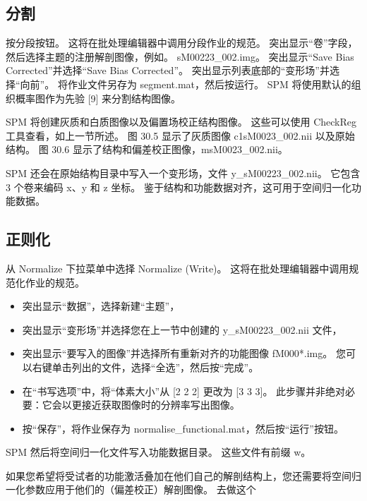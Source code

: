 \subsection{分割}
按分段按钮。 这将在批处理编辑器中调用分段作业的规范。 突出显示“卷”字段，然后选择主题的注册解剖图像，例如。 sM00223\_002.img。 突出显示“Save Bias Corrected”并选择“Save Bias Corrected”。 突出显示列表底部的“变形场”并选择“向前”。 将作业文件另存为 segment.mat，然后按运行。 SPM 将使用默认的组织概率图作为先验 [9] 来分割结构图像。

SPM 将创建灰质和白质图像以及偏置场校正结构图像。 这些可以使用 CheckReg 工具查看，如上一节所述。 图 30.5 显示了灰质图像 c1sM0023\_002.nii 以及原始结构。 图 30.6 显示了结构和偏差校正图像，msM0023\_002.nii。

SPM 还会在原始结构目录中写入一个变形场，文件 y\_sM00223\_002.nii。 它包含 3 个卷来编码 x、y 和 z 坐标。 鉴于结构和功能数据对齐，这可用于空间归一化功能数据。

\subsection{正则化}
从 Normalize 下拉菜单中选择 Normalize (Write)。 这将在批处理编辑器中调用规范化作业的规范。

\begin{itemize}
	\item 突出显示“数据”，选择新建“主题”，
	
	\item 突出显示“变形场”并选择您在上一节中创建的 y\_sM00223\_002.nii 文件，
	
	\item 突出显示“要写入的图像”并选择所有重新对齐的功能图像 fM000*.img。 您可以右键单击列出的文件，选择“全选”，然后按“完成”。
	
	\item 在“书写选项”中，将“体素大小”从 [2 2 2] 更改为 [3 3 3]。 此步骤并非绝对必要：它会以更接近获取图像时的分辨率写出图像。
	
	\item 按“保存”，将作业保存为 normalise\_functional.mat，然后按“运行”按钮。
\end{itemize}

SPM 然后将空间归一化文件写入功能数据目录。 这些文件有前缀 w。

如果您希望将受试者的功能激活叠加在他们自己的解剖结构上，您还需要将空间归一化参数应用于他们的（偏差校正）解剖图像。 去做这个

